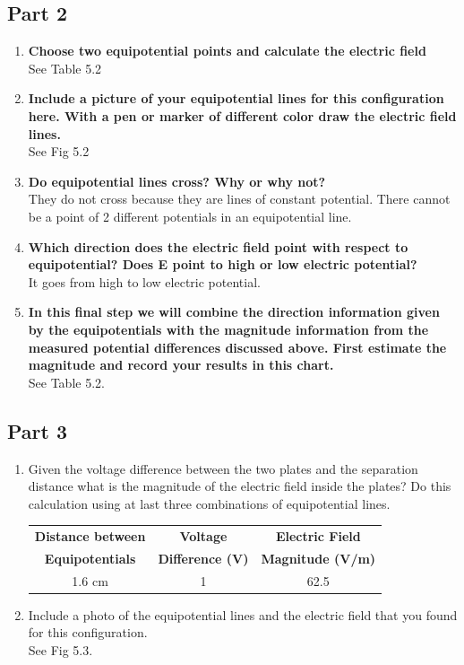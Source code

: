\documentclass[titlepage]{article}
\begin{document}
	\subsection{Part 2}
		\begin{enumerate}
			\item \textbf{Choose two equipotential points and calculate the electric field}\\
				See Table 5.2
            \item \textbf{Include a picture of your equipotential lines for this configuration here. With a pen or marker of different color draw the electric field lines.}\\
				See Fig 5.2
            \item \textbf{Do equipotential lines cross? Why or why not?}\\
				They do not cross because they are lines of constant potential. There cannot be a point of 2 different potentials in an equipotential line.
            \item \textbf{Which direction does the electric field point with respect to equipotential? Does E point to high or low electric potential?}\\
				It goes from high to low electric potential.
            \item \textbf{In this final step we will combine the direction information given by the equipotentials with the magnitude information from the measured potential differences discussed above. First estimate the magnitude and record your results in this chart.}\\
				See Table 5.2.
		\end{enumerate}
		\subsection{Part 3}
		\begin{enumerate}
			\item Given the voltage difference between the two plates and the separation distance what is the magnitude of the electric field inside the plates? Do this calculation using at last three combinations of equipotential lines.\\
		\begin{center}
				\begin{table}[h]
			\begin{tabular}{c|c|c}
				\textbf{Distance between} & \textbf{Voltage} & \textbf{Electric Field} \\
				\textbf{Equipotentials} & \textbf{Difference (V)} & \textbf{Magnitude (V/m)}\\
				\hline
				1.6 cm & 1 & 62.5\\
			\end{tabular}
		\end{table}
	\end{center}

			\item Include a photo of the equipotential lines and the electric field that you found for this configuration.\\
				See Fig 5.3.
		\end{enumerate}
\end{document}
